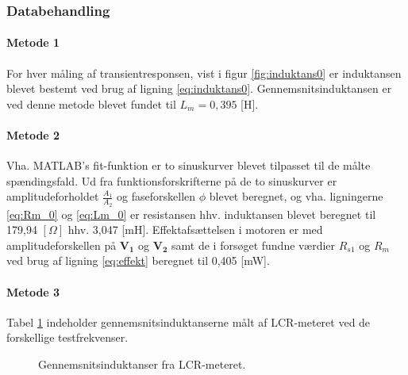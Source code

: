 \subsubsection{Databehandling}
\paragraph{Metode 1\\}
For hver måling af transientresponsen, vist i figur \ref{fig:induktans0} er induktansen blevet
bestemt ved brug af ligning \ref{eq:induktans0}.
Gennemsnitsinduktansen er ved denne metode blevet fundet til \(L_m=0,395\) [H].

\paragraph{Metode 2\\}
Vha. MATLAB's fit-funktion er to sinuskurver blevet tilpasset til de målte spændingsfald.
Ud fra funktionsforskrifterne på de to sinuskurver er amplitudeforholdet \(\frac{A_1}{A_2}\)
og faseforskellen \(\phi\) blevet beregnet,
og vha. ligningerne \ref{eq:Rm_0} og \ref{eq:Lm_0} er resistansen hhv. induktansen blevet beregnet til
179,94 \([\Omega]\) hhv. 3,047 [mH].
Effektafsættelsen i motoren er med amplitudeforskellen på \(\mathbf{V_1}\) og \(\mathbf{V_2}\) samt
de i forsøget fundne værdier \(R_{s1}\) og \(R_m\) ved brug af ligning \ref{eq:effekt} beregnet til 0,405 [mW].

\paragraph{Metode 3\\}
Tabel \ref{tb:lcr_avg} indeholder gennemsnitsinduktanserne målt af LCR-meteret ved de forskellige testfrekvenser.
\begin{figure}[th!]
	\centering
	
	\captionsetup{type=table}
	\caption[Gennemsnitsinduktanser fra LCR-meteret]
			{Gennemsnitsinduktanser fra LCR-meteret.}
	\label{tb:lcr_avg}
\end{figure}

